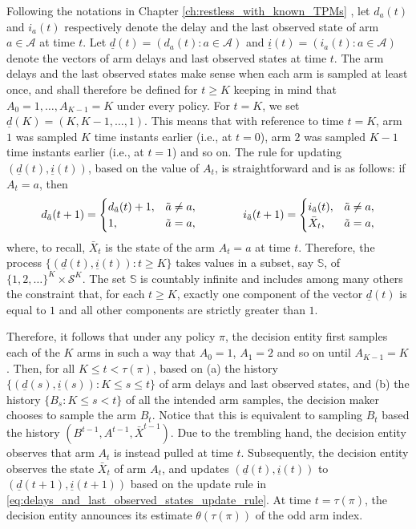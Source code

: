 Following the notations in Chapter \ref{ch:restless_with_known_TPMs} , let $d_a(t)$ and $i_a(t)$ respectively denote the delay and the last observed state of arm $a\in \mathcal{A}$ at time $t$. Let $\underline{d}(t)=(d_a(t):a\in \mathcal{A})$ and $\underline{i}(t)=(i_a(t):a\in \mathcal{A})$ denote the vectors of arm delays and last observed states at time $t$. The arm delays and the last observed states make sense when each arm is sampled at least once, and shall therefore be defined for $t\geq K$ keeping in mind that $A_0=1, \ldots, A_{K-1}=K$ under every policy. For $t=K$, we set $\underline{d}(K)=(K, K-1, \ldots, 1)$. This means that with reference to time $t=K$, arm $1$ was sampled $K$ time instants earlier (i.e., at $t=0$), arm $2$ was sampled $K-1$ time instants earlier (i.e., at $t=1$) and so on. The rule for updating $(\underline{d}(t), \underline{i}(t))$, based on the value of $A_t$, is straightforward and is as follows: if $A_{t}=a$, then
\begingroup \allowdisplaybreaks\begin{align}
	{d}_{\tilde{a}}(t+1)=\begin{cases}
		d_{\tilde{a}}(t)+1, &\tilde{a}\neq a,\\
		1,& \tilde{a}={\color{black} a},
	\end{cases} \qquad \qquad 
	i_{\tilde{a}}(t+1)=\begin{cases}
		i_{\tilde{a}}(t),& \tilde{a}\neq a,\\
		\bar{X}_{t},& \tilde{a}={\color{black} a},
	\end{cases}
	\label{eq:delays_and_last_observed_states_update_rule}
\end{align}\endgroup
where, to recall, $\bar{X}_{t}$ is the state of the arm $A_t=a$ at time $t$. Therefore, the process $\{(\underline{d}(t), \underline{i}(t)):t\geq K\}$ takes values in a subset, say $\mathbb{S}$, of $\{1, 2, \ldots\}^K\times \mathcal{S}^K $. The set $\mathbb{S}$ is countably infinite and includes among many others the constraint that, for each $t\geq K$, exactly one component of the vector $\underline{d}(t)$ is equal to $1$ and all other components are strictly greater than $1$. 

Therefore, it follows that under any policy $\pi$, the decision entity first samples each of the $K$ arms in such a way that $A_0=1$, $A_1=2$ and so on until $A_{K-1}=K$. Then, for all $K\leq t<\tau(\pi)$, based on (a) the history $\{(\underline{d}(s), \underline{i}(s)): K\leq s\leq t\}$ of arm delays and last observed states, and (b) the history $\{B_s:K\leq s<t\}$ of all the intended arm samples, the decision maker chooses to sample the arm $B_{t}$. Notice that this is equivalent to sampling $B_{t}$ based the history $(B^{t-1}, A^{t-1}, \bar{X}^{t-1})$. Due to the trembling hand, the decision entity observes that arm $A_{t}$ is instead pulled at time $t$. Subsequently, the decision entity observes the state $\bar{X}_{t}$ of arm $A_t$, and updates $(\underline{d}(t), \underline{i}(t))$ to $(\underline{d}(t+1), \underline{i}(t+1)) $ based on the update rule in \eqref{eq:delays_and_last_observed_states_update_rule}. At time $t=\tau(\pi)$, the decision entity announces its estimate $\theta(\tau(\pi))$ of the odd arm index. 

